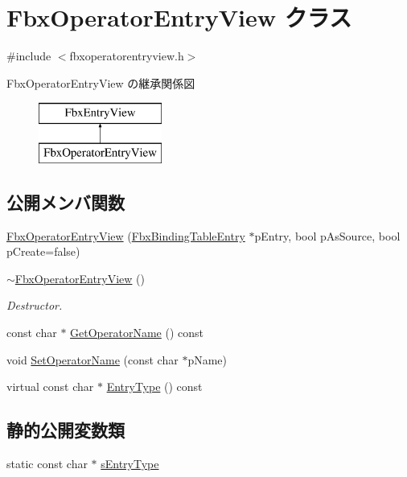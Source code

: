 \hypertarget{class_fbx_operator_entry_view}{}\section{Fbx\+Operator\+Entry\+View クラス}
\label{class_fbx_operator_entry_view}


{\ttfamily \#include $<$fbxoperatorentryview.\+h$>$}

Fbx\+Operator\+Entry\+View の継承関係図\begin{figure}[H]
\begin{center}
\leavevmode
\includegraphics[height=2.000000cm]{class_fbx_operator_entry_view}
\end{center}
\end{figure}
\subsection*{公開メンバ関数}
\begin{DoxyCompactItemize}
\item 
\hyperlink{class_fbx_operator_entry_view_aa76912191b34b80d88112072b6915182}{Fbx\+Operator\+Entry\+View} (\hyperlink{class_fbx_binding_table_entry}{Fbx\+Binding\+Table\+Entry} $\ast$p\+Entry, bool p\+As\+Source, bool p\+Create=false)
\item 
\hyperlink{class_fbx_operator_entry_view_a3f2e342d536396b35ec1308719295777}{$\sim$\+Fbx\+Operator\+Entry\+View} ()
\begin{DoxyCompactList}\small\item\em Destructor. \end{DoxyCompactList}\item 
const char $\ast$ \hyperlink{class_fbx_operator_entry_view_a7ce91f3c0d933aa9bb0ad8b9c1f82c32}{Get\+Operator\+Name} () const
\item 
void \hyperlink{class_fbx_operator_entry_view_a00d1bca18f1450d07326d22e889c7520}{Set\+Operator\+Name} (const char $\ast$p\+Name)
\item 
virtual const char $\ast$ \hyperlink{class_fbx_operator_entry_view_a7821c1bf43a30e4c8ba054c66f051ad0}{Entry\+Type} () const
\end{DoxyCompactItemize}
\subsection*{静的公開変数類}
\begin{DoxyCompactItemize}
\item 
static const char $\ast$ \hyperlink{class_fbx_operator_entry_view_aff3745ef35e5025550d54e7c2343ea95}{s\+Entry\+Type}
\end{DoxyCompactItemize}
